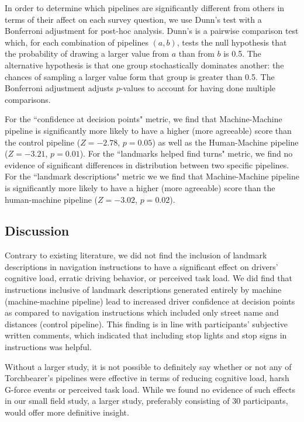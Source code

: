 In order to determine which pipelines are significantly different from others in terms of their affect on each survey question, we use Dunn's test with a Bonferroni adjustment for post-hoc analysis. Dunn's is a pairwise comparison test which, for each combination of pipelines $(a, b)$, tests the null hypothesis that the probability of drawing a larger value from $a$ than from $b$ is 0.5. The alternative hypothesis is that one group stochastically dominates another: the chances of sampling a larger value form that group is greater than 0.5. The Bonferroni adjustment adjusts $p$-values to account for having done multiple comparisons.

For the ``confidence at decision points" metric, we find that Machine-Machine pipeline is significantly more likely to have a higher (more agreeable) score than the control pipeline ($Z=-2.78$, $p=0.05$) as well as the Human-Machine pipeline ($Z=-3.21$, $p=0.01$). For the ``landmarks helped find turns" metric, we find no evidence of significant differences in distribution between two specific pipelines. For the ``landmark descriptions" metric we we find that Machine-Machine pipeline is significantly more likely to have a higher (more agreeable) score than the human-machine pipeline ($Z=-3.02$, $p=0.02$).

\subsection{Discussion}
Contrary to existing literature, we did not find the inclusion of landmark descriptions in navigation instructions to have a significant effect on drivers' cognitive load, erratic driving behavior, or perceived task load. We did find that instructions inclusive of landmark descriptions generated entirely by machine (machine-machine pipeline) lead to increased driver confidence at decision points as compared to navigation instructions which included only street name and distances (control pipeline). This finding is in line with participants' subjective written comments, which indicated that including stop lights and stop signs in instructions was helpful.

Without a larger study, it is not possible to definitely say whether or not any of Torchbearer's pipelines were effective in terms of reducing cognitive load, harsh G-force events or perceived task load. While we found no evidence of such effects in our small field study, a larger study, preferably consisting of 30 participants, would offer more definitive insight.

